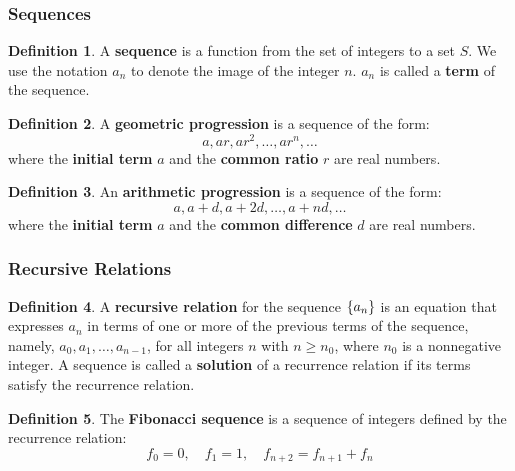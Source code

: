 \documentclass[article, 11pt]{article}
\theoremstyle{definition}
\newtheorem{definition}{Definition}[subsubsection]
\DeclarePairedDelimiter\set{\{}{\}}
\begin{document}
    \subsubsection{Sequences}
    \begin{definition}
        A \textbf{sequence} is a function from the set of integers to a set $S$. We use the notation $a_n$ to denote the image of the integer $n$. $a_n$ is called a \textbf{term} of the sequence.
    \end{definition}
    \begin{definition}
        A \textbf{geometric progression} is a sequence of the form:
        \begin{equation*}
            a, ar, ar^2, \dots, ar^n, \dots 
        \end{equation*}
        where the \textbf{initial term} $a$ and the \textbf{common ratio} $r$ are real numbers.
    \end{definition}
    \begin{definition}
        An \textbf{arithmetic progression} is a sequence of the form:
        \begin{equation*}
            a, a+d, a+2d, \dots, a+nd, \dots
        \end{equation*}
        where the \textbf{initial term} $a$ and the \textbf{common difference} $d$ are real numbers.
    \end{definition}
    \subsubsection{Recursive Relations}
    \begin{definition}
        A \textbf{recursive relation} for the sequence $\set*{a_n}$ is an equation that expresses $a_n$ in terms of one or more of the previous terms of the sequence, namely, $a_0, a_1, \dots, a_{n-1}$, for all integers $n$ with $n \geq n_0$, where $n_0$ is a nonnegative integer. A sequence is called a \textbf{solution} of a recurrence relation if its terms satisfy the recurrence relation.
    \end{definition}
    \begin{definition}
        The \textbf{Fibonacci sequence} is a sequence of integers defined by the recurrence relation:
        \begin{equation*}
            f_0 = 0, \quad f_1 = 1, \quad f_{n+2} = f_{n+1} + f_n
        \end{equation*}
    \end{definition}
\end{document}
